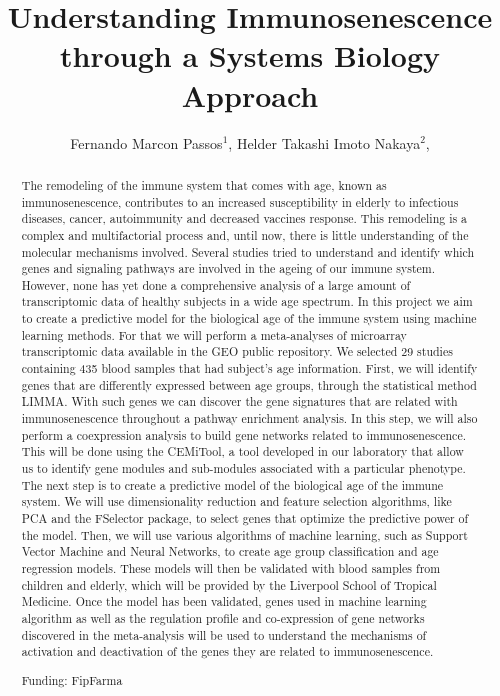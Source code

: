 \documentclass[twoside]{article}
\title{\vspace{-15mm}\fontsize{24pt}{10pt}\selectfont\textbf{ Understanding Immunosenescence through a Systems Biology Approach }} %
\author{ Fernando Marcon Passos$^{1}$, Helder Takashi Imoto Nakaya$^{2}$, }
\affil{ 1 Universidade de São Paulo

2 University of São Paulo

 }
\date{}
\begin{document}
  
  
  \maketitle %
  
  
  \thispagestyle{fancy} %
  
  
  \begin{abstract}
  The remodeling of the immune system that comes with age, known as immunosenescence, contributes to an increased susceptibility in elderly to infectious diseases, cancer, autoimmunity and decreased vaccines response. This remodeling is a complex and multifactorial process and, until now, there is little understanding of the molecular mechanisms involved. Several studies tried to understand and identify which genes and signaling pathways are involved in the ageing of our immune system. However, none has yet done a comprehensive analysis of a large amount of transcriptomic data of healthy subjects in a wide age spectrum.
In this project we aim to create a predictive model for the biological age of the immune system using machine learning methods. For that we will perform a meta-analyses of microarray transcriptomic data available in the GEO public repository. We selected 29 studies containing 435 blood samples that had subject’s age information.
First, we will identify genes that are differently expressed between age groups, through the statistical method LIMMA. With such genes we can discover the gene signatures that are related with immunosenescence throughout a pathway enrichment analysis. In this step, we will also perform a coexpression analysis to build gene networks related to immunosenescence. This will be done using the CEMiTool, a tool developed in our laboratory that allow us to identify gene modules and sub-modules associated with a particular phenotype.
The next step is to create a predictive model of the biological age of the immune system. We will use dimensionality reduction and feature selection algorithms, like PCA and the FSelector package, to select genes that optimize the predictive power of the model. Then, we will use various algorithms of machine learning, such as Support Vector Machine and Neural Networks, to create age group classification and age regression models. These models will then be validated with blood samples from children and elderly, which will be provided by the Liverpool School of Tropical Medicine.
Once the model has been validated, genes used in machine learning algorithm as well as the regulation profile and co-expression of gene networks discovered in the meta-analysis will be used to understand the mechanisms of activation and deactivation of the genes they are related to immunosenescence.
  
  Funding: FipFarma \\ 
  \end{abstract}
  
\end{document}
